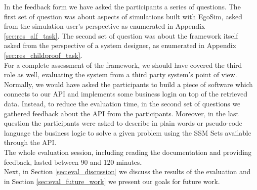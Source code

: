In the feedback form we have asked the participants a series of questions. The first set of question was about aspects of simulations built with EgoSim, asked from the simulation user's perspective as enumerated in Appendix \ref{sec:res_alf_task}. The second set of question was about the framework itself asked from the perspective of a system designer, as enumerated in Appendix \ref{sec:res_childproof_task}.\\

For a complete assessment of the framework, we should have covered the third role as well, evaluating the system from a third party system's point of view. Normally, we would have asked the participants to build a piece of software which connects to our API and implements some business login on top of the retrieved data. Instead, to reduce the evaluation time, in the second set of questions we gathered feedback about the API from the participants. Moreover, in the last question the participants were asked to describe in plain words or pseudo-code language the business logic to solve a given problem using the SSM Sets available through the API.\\

The whole evaluation session, including reading the documentation and providing feedback, lasted between 90 and 120 minutes.\\

Next, in Section \ref{sec:eval_discussion} we discuss the results of the evaluation and in Section \ref{sec:eval_future_work} we present our goals for future work.\\
